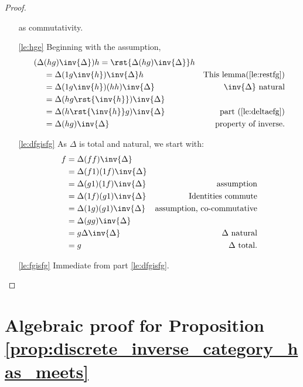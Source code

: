 \begin{proof}
\begin{enumerate}[{(}i{)}]
      as commutativity.
    \item[\ref{le:hge}]Beginning with the assumption,
      \begin{align*}
        (\Delta &(h \* g)\inv{\Delta})h  = \rst{\Delta (h \* g) \inv{\Delta}}h&\\
        &=\Delta(1 \* g \inv{h}) \inv{\Delta}h&\text{This lemma(\ref{le:restfg})}\\
        &=\Delta(1 \* g \inv{h}) (h\*h)\inv{\Delta}&\inv{\Delta}\text{ natural}\\
        &=\Delta(h \* g \rst{\inv{h}}) \inv{\Delta}&\\
        &=\Delta(h\rst{\inv{h}} \* g) \inv{\Delta}&\text{part (\ref{le:deltaefg})}\\
         &=\Delta(h\*g)\inv{\Delta}&\text{property of inverse}.
      \end{align*}

    \item[\ref{le:dfgisfg}]As $\Delta$ is total and natural, we start with:
      \begin{align*}
        f&=\Delta(f\*f)\inv{\Delta}  & \\
        &= \Delta(f\*1)(1\*f)\inv{\Delta} &  \\
        &= \Delta(g\*1)(1\*f)\inv{\Delta} &\text{assumption} \\
        &= \Delta(1\*f)(g\*1)\inv{\Delta} &\text{Identities commute}\\
        &= \Delta(1\*g)(g\*1)\inv{\Delta} &\text{assumption, co-commutative}\\
        &= \Delta(g\*g)\inv{\Delta} \\
        &= g\Delta\inv{\Delta} & \Delta \text{ natural}\\
        &= g&\Delta\text{ total}.
      \end{align*}
    \item[\ref{le:fgisfg}] Immediate from part \ref{le:dfgisfg}.
  \end{enumerate}
\end{proof}

\section{Algebraic proof for Proposition \ref{prop:discrete_inverse_category_has_meets}}

